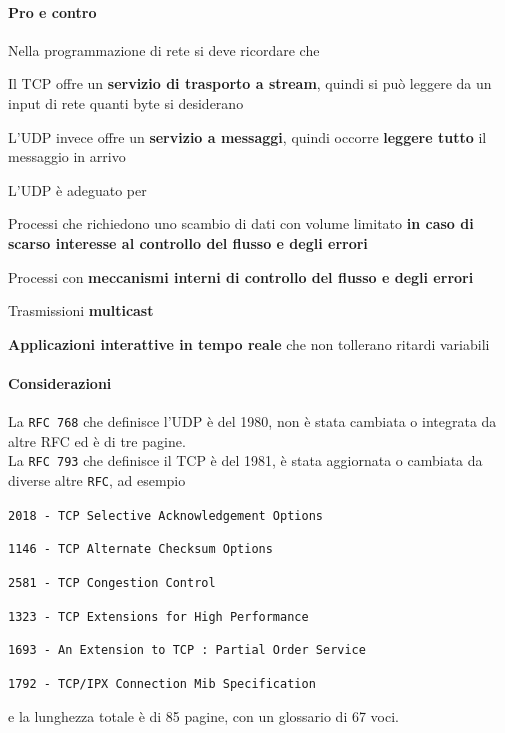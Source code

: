 \documentclass[10pt]{article}
\begin{document}
\paragraph{Pro e contro} Nella programmazione di rete si deve ricordare che
\begin{list}{}{}
\item Il TCP offre un \textbf{servizio di trasporto a stream}, quindi si può leggere da un input di rete quanti byte si desiderano
\item L'UDP invece offre un \textbf{servizio a messaggi}, quindi occorre \textbf{leggere tutto} il messaggio in arrivo
\item L'UDP è adeguato per
\begin{list}{}{}
\item Processi che richiedono uno scambio di dati con volume limitato \textbf{in caso di scarso interesse al controllo del flusso e degli errori}
\item Processi con \textbf{meccanismi interni di controllo del flusso e degli errori}
\item Trasmissioni \textbf{multicast}
\item \textbf{Applicazioni interattive in tempo reale} che non tollerano ritardi variabili
\end{list}
\end{list}
\paragraph{Considerazioni} La \texttt{RFC 768} che definisce l'UDP è del 1980, non è stata cambiata o integrata da altre RFC ed è di tre pagine.\\
La \texttt{RFC 793} che definisce il TCP è del 1981, è stata aggiornata o cambiata da diverse altre \texttt{RFC}, ad esempio
\begin{list}{}{}
\item \texttt{2018 - TCP Selective Acknowledgement Options}
\item \texttt{1146 - TCP Alternate Checksum Options}
\item \texttt{2581 - TCP Congestion Control}
\item \texttt{1323 - TCP Extensions for High Performance}
\item \texttt{1693 - An Extension to TCP : Partial Order Service}
\item \texttt{1792 - TCP/IPX Connection Mib Specification}
\end{list}
e la lunghezza totale è di 85 pagine, con un glossario di 67 voci.
\pagebreak
\end{document}
